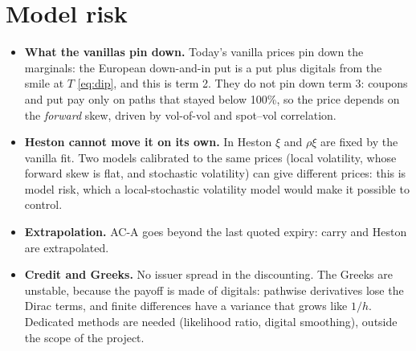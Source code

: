 \section{Model risk}
\begin{itemize}
\item \textbf{What the vanillas pin down.} Today's vanilla prices pin down the marginals: the European down-and-in put
is a put plus digitals from the smile at $T$ \eqref{eq:dip}, and this is term 2. They do not pin down term 3: coupons
and put pay only on paths that stayed below 100\%, so the price depends on the \emph{forward} skew, driven by
vol-of-vol and spot--vol correlation.
\item \textbf{Heston cannot move it on its own.} In Heston $\xi$ and $\rho\xi$ are fixed by the vanilla fit. Two models
calibrated to the same prices (local volatility, whose forward skew is flat, and stochastic volatility) can give
different prices: this is model risk, which a local-stochastic volatility model would make it possible to control.
\item \textbf{Extrapolation.} \mbox{AC-A} goes beyond the last quoted expiry: carry and Heston are extrapolated.
\item \textbf{Credit and Greeks.} No issuer spread in the discounting. The Greeks are unstable, because the payoff is
made of digitals: pathwise derivatives lose the Dirac terms, and finite differences have a variance that grows like
$1/h$. Dedicated methods are needed (likelihood ratio, digital smoothing), outside the scope of the project.
\end{itemize}

